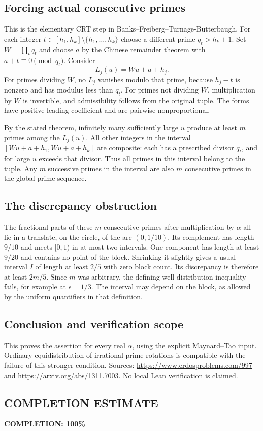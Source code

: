 \subsection*{Forcing actual consecutive primes}
This is the elementary CRT step in Banks--Freiberg--Turnage-Butterbaugh.
For each integer $t\in[h_1,h_k]\setminus\{h_1,\ldots,h_k\}$ choose a different prime $q_t>h_k+1$.
Set $W=\prod_tq_t$ and choose $a$ by the Chinese remainder theorem with
$a+t\equiv0\pmod{q_t}$. Consider
\[
 L_j(u)=Wu+a+h_j.
\]
For primes dividing $W$, no $L_j$ vanishes modulo that prime, because
$h_j-t$ is nonzero and has modulus less than $q_t$.
For primes not dividing $W$, multiplication by $W$ is invertible, and admissibility follows from the original tuple. The forms have positive leading coefficient and are pairwise nonproportional.

By the stated theorem, infinitely many sufficiently large $u$ produce at least $m$ primes among the $L_j(u)$.
All other integers in the interval
$[Wu+a+h_1,Wu+a+h_k]$ are composite: each has a prescribed divisor $q_t$, and for large $u$ exceeds that divisor.
Thus all primes in this interval belong to the tuple. Any $m$ successive primes in the interval are also $m$ consecutive primes in the global prime sequence.

\subsection*{The discrepancy obstruction}
The fractional parts of these $m$ consecutive primes after multiplication by $\alpha$ all lie in a translate, on the circle, of the arc $(0,1/10)$.
Its complement has length $9/10$ and meets $[0,1)$ in at most two intervals. One component has length at least $9/20$ and contains no point of the block. Shrinking it slightly gives a usual interval $I$ of length at least $2/5$ with zero block count. Its discrepancy is therefore at least $2m/5$.
Since $m$ was arbitrary, the defining well-distribution inequality fails, for example at $\epsilon=1/3$. The interval may depend on the block, as allowed by the uniform quantifiers in that definition.

\subsection*{Conclusion and verification scope}
This proves the assertion for every real $\alpha$, using the explicit Maynard--Tao input. Ordinary equidistribution of irrational prime rotations is compatible with the failure of this stronger condition. Sources: \url{https://www.erdosproblems.com/997} and \url{https://arxiv.org/abs/1311.7003}. No local Lean verification is claimed.
\subsection*{COMPLETION ESTIMATE}
\textbf{COMPLETION: 100\%}
